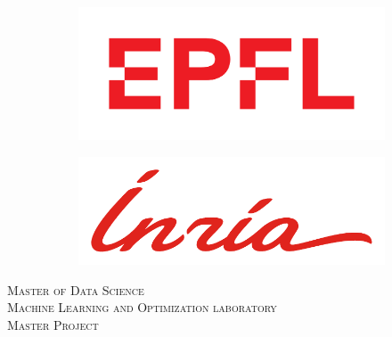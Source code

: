 
\begin{titlepage}
\begin{center}

\sffamily

\null\vspace{1cm}

\begin{figure}[H]
	\centering
	\begin{subfigure}{.5\textwidth}
		\centering
		\includegraphics[width=0.6\linewidth]{figures/epfl.pdf}
	\end{subfigure}%
	\begin{subfigure}{.5\textwidth}
		\centering
		\includegraphics[width=0.6\linewidth]{figures/inria_pms.pdf}
	\end{subfigure}
\end{figure}

\vspace{2cm}

\textsc{\large Master of Data Science}\\
\textsc{Machine Learning and Optimization laboratory}\\
\textsc{\large Master Project}\\

\vspace{2cm}


\end{center}
\end{titlepage}
